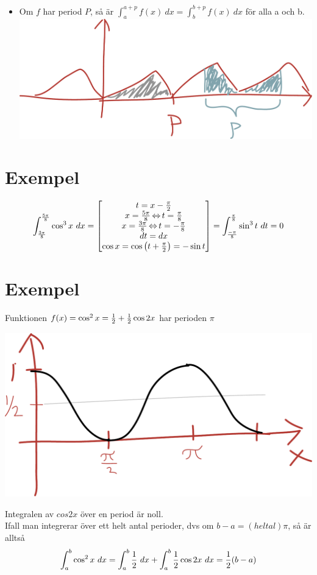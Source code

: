\documentclass{article}
\begin{document}
\begin{itemize}
  \item Om $f$ har period $P$, så är $\int^{a+p}_a{f(x)\ dx}=\int^{b+p}_b{f(x)\ dx}$ för alla a och b.\\
    \includegraphics[scale=0.25]{img/img3.pdf}
\end{itemize}

\section{Exempel}
$$ \int^{5\pi \over 8}_{3\pi \over 8}{\cos^3 x\ dx}=\left[\begin{matrix}t=x-\frac{\pi}{2}\\x=\frac{5 \pi}{8} \operatorname{\Leftrightarrow} t=\frac{\pi}{8} \\x=\frac{3 \pi}{8} \operatorname{\Leftrightarrow} t=-\frac{\pi}{8}\\dt=dx\\ \cos x = \cos\left(t+\frac{\pi}{2}\right) = -\sin t\end{matrix}\right]=
\int^{\pi \over 8}_{-\pi \over 8}{\sin^3 t\ dt} = 0 $$

\section{Exempel}
Funktionen $f(x)=\cos^2 x = \frac{1}{2} + \frac{1}{2} \cos 2x$ har perioden $\pi$

\includegraphics[scale=0.25]{img/img4.pdf}

Integralen av $cos 2x$ över en period är noll.\\
Ifall man integrerar över ett helt antal perioder, dvs om $b-a = (heltal)\pi$, så är alltså
$$ \int^b_a{\cos^2 x\ dx} = \int^b_a{\frac{1}{2}\ dx}+ \int^b_a{\frac{1}{2} \cos 2x\ dx} = \frac{1}{2} (b-a) $$
\end{document}
